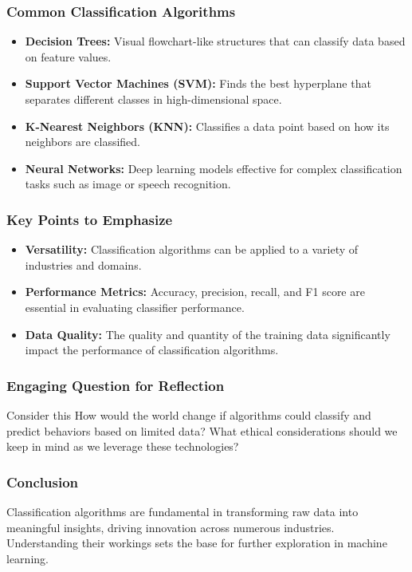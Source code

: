 \documentclass[aspectratio=169]{beamer}
\begin{document}
\begin{frame}[fragile]
    \frametitle{Common Classification Algorithms}
    \begin{itemize}
        \item \textbf{Decision Trees:} 
        Visual flowchart-like structures that can classify data based on feature values.
        \item \textbf{Support Vector Machines (SVM):} 
        Finds the best hyperplane that separates different classes in high-dimensional space.
        \item \textbf{K-Nearest Neighbors (KNN):} 
        Classifies a data point based on how its neighbors are classified.
        \item \textbf{Neural Networks:} 
        Deep learning models effective for complex classification tasks such as image or speech recognition.
    \end{itemize}
\end{frame}

\begin{frame}[fragile]
    \frametitle{Key Points to Emphasize}
    \begin{itemize}
        \item \textbf{Versatility:} 
        Classification algorithms can be applied to a variety of industries and domains.
        \item \textbf{Performance Metrics:} 
        Accuracy, precision, recall, and F1 score are essential in evaluating classifier performance.
        \item \textbf{Data Quality:} 
        The quality and quantity of the training data significantly impact the performance of classification algorithms.
    \end{itemize}
\end{frame}

\begin{frame}[fragile]
    \frametitle{Engaging Question for Reflection}
    \begin{block}{Consider this}
        How would the world change if algorithms could classify and predict behaviors based on limited data? What ethical considerations should we keep in mind as we leverage these technologies?
    \end{block}
\end{frame}

\begin{frame}[fragile]
    \frametitle{Conclusion}
    Classification algorithms are fundamental in transforming raw data into meaningful insights, driving innovation across numerous industries. Understanding their workings sets the base for further exploration in machine learning.
\end{frame}
\end{document}

